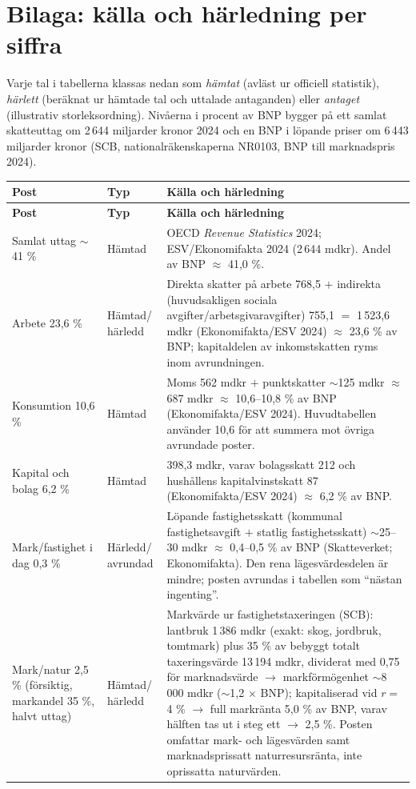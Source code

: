 \documentclass[11pt]{article}
\begin{document}
\section*{Bilaga: källa och härledning per siffra}

Varje tal i tabellerna klassas nedan som \emph{hämtat} (avläst ur officiell statistik), \emph{härlett} (beräknat ur hämtade tal och uttalade antaganden) eller \emph{antaget} (illustrativ storleksordning). Nivåerna i procent av BNP bygger på ett samlat skatteuttag om 2\,644 miljarder kronor 2024 och en BNP i löpande priser om 6\,443 miljarder kronor (SCB, nationalräkenskaperna NR0103, BNP till marknadspris 2024).

{\small
\begin{longtable}{@{}p{2.7cm}p{1.8cm}p{9.6cm}@{}}
\hline
\textbf{Post} & \textbf{Typ} & \textbf{Källa och härledning} \\
\hline
\endfirsthead
\hline
\textbf{Post} & \textbf{Typ} & \textbf{Källa och härledning} \\
\hline
\endhead
\hline
\endfoot
Samlat uttag $\sim$41 \% & Hämtad & OECD \textit{Revenue Statistics} 2024; ESV/Ekonomifakta 2024 (2\,644 mdkr). Andel av BNP $\approx$ 41,0 \%. \\
Arbete 23,6 \% & Hämtad/ härledd & Direkta skatter på arbete 768,5 $+$ indirekta (huvudsakligen sociala avgifter/arbetsgivaravgifter) 755,1 $=$ 1\,523,6 mdkr (Ekonomifakta/ESV 2024) $\approx$ 23,6 \% av BNP; kapitaldelen av inkomstskatten ryms inom avrundningen. \\
Konsumtion 10,6 \% & Hämtad & Moms 562 mdkr $+$ punktskatter $\sim$125 mdkr $\approx$ 687 mdkr $\approx$ 10,6--10,8 \% av BNP (Ekonomifakta/ESV 2024). Huvudtabellen använder 10,6 för att summera mot övriga avrundade poster. \\
Kapital och bolag 6,2 \% & Hämtad & 398,3 mdkr, varav bolagsskatt 212 och hushållens kapitalvinstskatt 87 (Ekonomifakta/ESV 2024) $\approx$ 6,2 \% av BNP. \\
Mark/fastighet i dag 0,3 \% & Härledd/ avrundad & Löpande fastighetsskatt (kommunal fastighetsavgift $+$ statlig fastighetsskatt) $\sim$25--30 mdkr $\approx$ 0,4--0,5 \% av BNP (Skatteverket; Ekonomifakta). Den rena lägesvärdesdelen är mindre; posten avrundas i tabellen som \enquote{nästan ingenting}. \\
Mark/natur 2,5 \% (försiktig, markandel 35 \%, halvt uttag) & Hämtad/ härledd & Markvärde ur fastighetstaxeringen (SCB): lantbruk 1\,386 mdkr (exakt: skog, jordbruk, tomtmark) plus 35 \% av bebyggt totalt taxeringsvärde 13\,194 mdkr, dividerat med 0,75 för marknadsvärde $\to$ markförmögenhet $\sim$8\,000 mdkr ($\sim$1,2 $\times$ BNP); kapitaliserad vid $r=$4 \% $\to$ full markränta 5,0 \% av BNP, varav hälften tas ut i steg ett $\to$ 2,5 \%. Posten omfattar mark- och lägesvärden samt marknadsprissatt naturresursränta, inte oprissatta naturvärden. \\

\end{longtable}}
\end{document}
